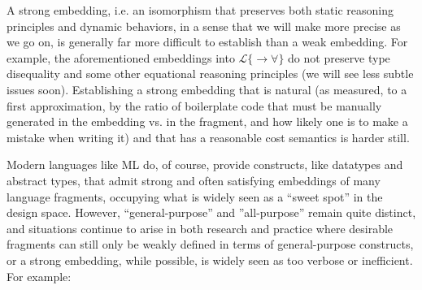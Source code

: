\documentclass[9pt,preprint]{sigplanconf}
\begin{document}
%

A strong embedding, i.e. an isomorphism that preserves both static reasoning principles and dynamic behaviors, in a sense that we will make more precise as we go on, is generally far more difficult to establish than a weak embedding. For example, the aforementioned embeddings into $\mathcal{L}\{\rightarrow\forall\}$ do not preserve type disequality and some other equational reasoning principles (we will see less subtle issues soon). Establishing a strong embedding that is natural (as measured, to a first approximation, by the ratio of boilerplate code that must be manually generated in the embedding vs. in the fragment, and how likely one is to make a mistake when writing it) and that has a reasonable cost semantics is harder still.

Modern languages like ML do, of course, provide constructs, like datatypes and abstract types, that admit strong and often satisfying embeddings of many language fragments, occupying what is widely seen as a ``sweet spot'' in the design space. However, ``general-purpose'' and ''all-purpose'' remain quite distinct, and situations continue to arise in both research and practice where desirable fragments can still only be weakly defined in terms of general-purpose constructs, or a strong embedding, while possible, is widely seen as too verbose or inefficient. For example:
\end{document}

